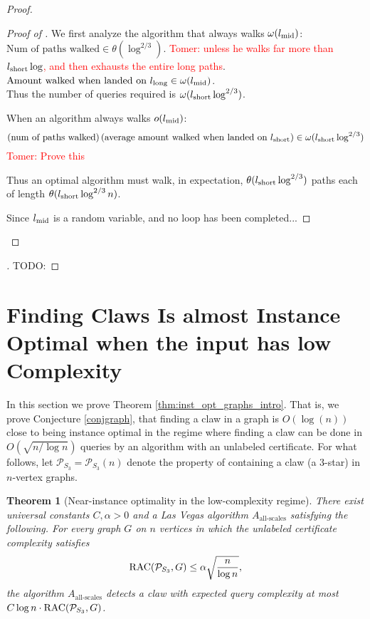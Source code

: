 \documentclass[11pt]{article}
\numberwithin{equation}{section}
\newtheorem{theorem}{Theorem}[section]
\renewcommand{\P}{\mathcal{P}}
\newcommand{\1}{\mathbf{1}}
\newcommand{\beq}{\begin{equation}}
\newcommand{\eeq}{\end{equation}}
\newcommand\tomer[1]{{\textcolor{red}{Tomer: #1}}}
\begin{document}
{\begin{proof}
\begin{proof}[Proof of ]
We first analyze the algorithm that always walks $\omega(l_{\text{mid}})$:\\
$\text{Num of paths walked} \in \theta(\log^{2/3})$. \tomer{unless he walks far more than $l_{\text{short}} \log$, and then exhausts the entire long paths}.
\\
$\text{Amount walked when landed on $l_{\text{long}}$} \in \omega(l_{\text{mid}})$.
\\
Thus the number of queries required is $\omega(l_{\text{short}}\log^{2/3})$.

When an algorithm always walks $o(l_{\text{mid}})$: \beq \left(\text{num of paths walked}\right) \left( \text{average amount walked when landed on $\lshort$} \right) \in \omega(\lshort\log^{2/3}) \eeq \tomer{Prove this}

 
 Thus an optimal algorithm must walk, in expectation, $\theta(l_{\text{short}}\log^{2/3})$ paths each of length $\theta(l_{\text{short}} \log^{2/3} n)$. 
 
 Since $l_{\text{mid}}$ is a random variable, and no loop has been completed...
 
 
 \end{proof}



\end{proof}

\begin{proof}[]
TODO:

\end{proof}
} 
\section{Finding Claws Is almost Instance Optimal when the input has low Complexity} \label{sec:AlmostIO}


In this section we prove Theorem \ref{thm:inst_opt_graphs_intro}. That is, we prove Conjecture \ref{conjgraph}, that finding a claw in a graph is $O(\log(n))$ close to being instance optimal in the regime where finding a claw can be done in $O(\sqrt{n/\log n})$ queries by an algorithm with an unlabeled certificate. For what follows, let $\P_{S_3} = \P_{S_3}(n)$ denote the property of containing a claw (a $3$-star) in $n$-vertex graphs. 

\begin{theorem}[Near-instance optimality in the low-complexity regime] 
\label{thm:near_instance_optimality}
There exist universal constants $C, \alpha > 0$ and a Las Vegas algorithm $A_{\text{all-scales}}$ satisfying the following.
For every graph $G$ on $n$ vertices in which the unlabeled certificate complexity satisfies
$$\RACC(\P_{S_3}, G) \leq \alpha \sqrt{\frac{n}{\log n}},$$
the algorithm $A_{\text{all-scales}}$ detects a claw with expected query complexity at most $C \log n \cdot \RACC(\P_{S_3}, G)$.
\end{theorem}
\end{document}
